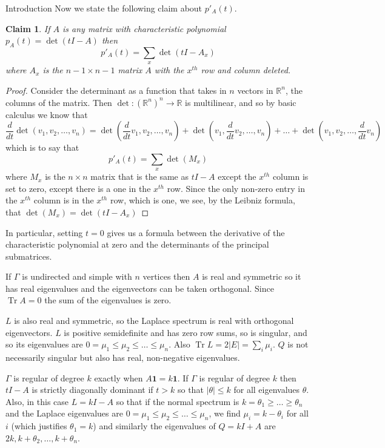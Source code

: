 \documentclass{article}
\DeclareMathOperator{\tr}{Tr}
\newcommand{\R}{\mathbb R}
\newtheorem{claim}{Claim}
\begin{document}
\begin{section}{Introduction}
  Now we state the following claim about $p'_A(t)$.
  \begin{claim}\label{char-poly-deriv}
    If $A$ is any matrix with characteristic polynomial $p_A(t) = \det(tI - A)$ then
    $$
    p'_A(t) = \sum_x\det(tI - A_x)
    $$
    where $A_x$ is the $n-1\times n-1$ matrix $A$ with the $x^{th}$ row and column deleted.
  \end{claim}
  \begin{proof}
    Consider the determinant as a function that takes in $n$ vectors in $\R^n$, the columns of the matrix.
    Then $\det : (\R^n)^n \to \R$ is multilinear, and so by basic calculus we know that
    $$
    \frac{d}{dt}\det(v_1,v_2,\ldots,v_n) = \det(\frac{d}{dt}v_1,v_2,\ldots,v_n) + \det(v_1,\frac{d}{dt}v_2,\ldots,v_n) + \ldots + \det(v_1,v_2,\ldots,\frac{d}{dt}v_n)
    $$
    which is to say that
    $$
    p'_A(t) = \sum_x \det(M_x)
    $$
    where $M_x$ is the $n \times n$ matrix that is the same as $tI - A$ except the $x^{th}$ column is set to zero, except there is a one in the $x^{th}$ row.
    Since the only non-zero entry in the $x^{th}$ column is in the $x^{th}$ row, which is one, we see, by the Leibniz formula, that $\det(M_x) = \det(tI - A_x)$
  \end{proof}

  In particular, setting $t = 0$ gives us a formula between the derivative of the characteristic polynomial at zero and the determinants of the principal submatrices.

  If $\Gamma$ is undirected and simple with $n$ vertices then $A$ is real and symmetric so it has real eigenvalues and the eigenvectors can be taken orthogonal.
  Since $\tr A = 0$ the sum of the eigenvalues is zero.

  $L$ is also real and symmetric, so the Laplace spectrum is real with orthogonal eigenvectors.
  $L$ is positive semidefinite and has zero row sums, so is singular, and so its eigenvalues are $0 = \mu_1 \leq \mu_2 \leq \ldots \leq \mu_n$.
  Also
  $\tr L = 2|E| = \sum_i \mu_i$.
  $Q$ is not necessarily singular but also has real, non-negative eigenvalues.

  $\Gamma$ is regular of degree $k$ exactly when $A\mathbf{1} = k\mathbf{1}$.
  If $\Gamma$ is regular of degree $k$ then $tI - A$ is strictly diagonally dominant if $t > k$ so that $|\theta| \leq k$ for all eigenvalues $\theta$.
  Also, in this case $L = kI - A$ so that if the normal spectrum is $k = \theta_1 \geq \ldots \geq \theta_n$  and the Laplace eigenvalues are $0 = \mu_1 \leq \mu_2 \leq \ldots \leq \mu_n$, we find $\mu_i = k - \theta_i$ for all $i$ (which justifies $\theta_1 = k$) and similarly the eigenvalues of $Q = kI + A$ are $2k, k + \theta_2, \ldots, k + \theta_n$.


\end{section}
\end{document}
